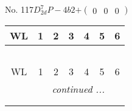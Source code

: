 \documentclass[fleqn,9pt,landscape]{jsarticle}
\begin{document}
\newpage
No. 117\quad$D_{2d}^{7}$\quad$P-4b2$\quad[ tetragonal ]\quad$+\begin{pmatrix} 0 & 0 & 0 \end{pmatrix}$
\begin{center}
\renewcommand{\arraystretch}{1.2}
\begin{longtable}{ccccccc}
 \hline \hline
WL & 1 & 2 & 3 & 4 & 5 & 6 \\ \hline \endfirsthead

\multicolumn{6}{l}{\tablename\ \thetable{}} \\
 \hline \hline
WL & 1 & 2 & 3 & 4 & 5 & 6 \\ \hline \endhead

 \hline \hline
\multicolumn{6}{r}{\footnotesize\it continued ...} \\ \endfoot

 \hline \hline
\multicolumn{6}{r}{} \\ \endlastfoot


\end{longtable}
\end{center}
\end{document}
